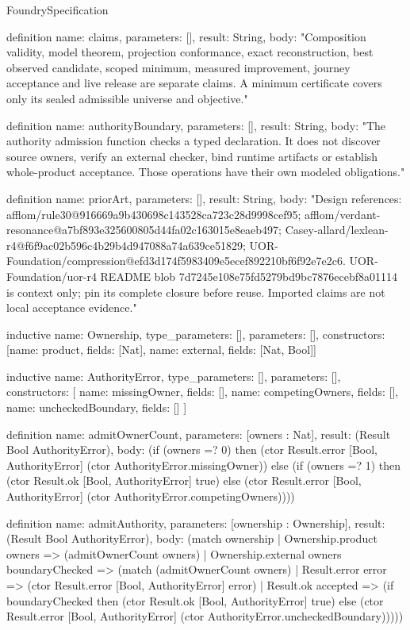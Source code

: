\begin{lexlean}{FoundrySpecification}
\begin{semanticmodule}
definition{
  name: claims,
  parameters: [],
  result: String,
  body: "Composition validity, model theorem, projection conformance, exact reconstruction, best observed candidate, scoped minimum, measured improvement, journey acceptance and live release are separate claims. A minimum certificate covers only its sealed admissible universe and objective."
}

definition{
  name: authorityBoundary,
  parameters: [],
  result: String,
  body: "The authority admission function checks a typed declaration. It does not discover source owners, verify an external checker, bind runtime artifacts or establish whole-product acceptance. Those operations have their own modeled obligations."
}

definition{
  name: priorArt,
  parameters: [],
  result: String,
  body: "Design references: afflom/rule30@916669a9b430698c143528ca723c28d9998cef95; afflom/verdant-resonance@a7bf893e325600805d44fa02c163015e8eaeb497; Casey-allard/lexlean-r4@f6f9ac02b596c4b29b4d947088a74a639ce51829; UOR-Foundation/compression@efd3d174f5983409e5ecef892210bf6f92e7e2c6. UOR-Foundation/uor-r4 README blob 7d7245e108e75fd5279bd9bc7876ecebf8a01114 is context only; pin its complete closure before reuse. Imported claims are not local acceptance evidence."
}

inductive{
  name: Ownership,
  type_parameters: [],
  parameters: [],
  constructors: [{name: product, fields: [Nat]}, {name: external, fields: [Nat, Bool]}]
}

inductive{
  name: AuthorityError,
  type_parameters: [],
  parameters: [],
  constructors: [
    {name: missingOwner, fields: []},
    {name: competingOwners, fields: []},
    {name: uncheckedBoundary, fields: []}
  ]
}

definition{
  name: admitOwnerCount,
  parameters: [owners : Nat],
  result: (Result Bool AuthorityError),
  body: (if (owners =? 0) then (ctor Result.error [Bool, AuthorityError] (ctor AuthorityError.missingOwner)) else (if (owners =? 1) then (ctor Result.ok [Bool, AuthorityError] true) else (ctor Result.error [Bool, AuthorityError] (ctor AuthorityError.competingOwners))))
}

definition{
  name: admitAuthority,
  parameters: [ownership : Ownership],
  result: (Result Bool AuthorityError),
  body: (match ownership
    | Ownership.product owners => (admitOwnerCount owners)
    | Ownership.external owners boundaryChecked => (match (admitOwnerCount owners)
      | Result.error error => (ctor Result.error [Bool, AuthorityError] error)
      | Result.ok accepted => (if boundaryChecked then (ctor Result.ok [Bool, AuthorityError] true) else (ctor Result.error [Bool, AuthorityError] (ctor AuthorityError.uncheckedBoundary)))))
}


\end{semanticmodule}
\end{lexlean}
